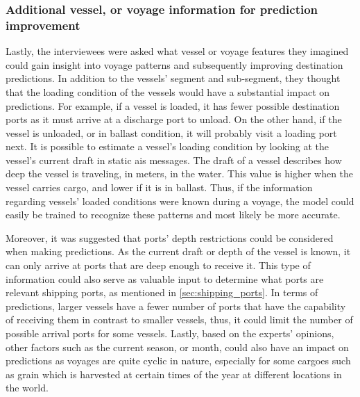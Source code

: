 \subsubsection{Additional vessel, or voyage information for prediction improvement}

Lastly, the interviewees were asked what vessel or voyage features they imagined could gain insight into voyage patterns and subsequently improving destination predictions. In addition to the vessels' segment and sub-segment, they thought that the loading condition of the vessels would have a substantial impact on predictions. For example, if a vessel is loaded, it has fewer possible destination ports as it must arrive at a discharge port to unload. On the other hand, if the vessel is unloaded, or in ballast condition, it will probably visit a loading port next. It is possible to estimate a vessel's loading condition by looking at the vessel's current draft in static \acrshort{ais} messages. The draft of a vessel describes how deep the vessel is traveling, in meters, in the water. This value is higher when the vessel carries cargo, and lower if it is in ballast. Thus, if the information regarding vessels' loaded conditions were known during a voyage, the model could easily be trained to recognize these patterns and most likely be more accurate.

Moreover, it was suggested that ports' depth restrictions could be considered when making predictions. As the current draft or depth of the vessel is known, it can only arrive at ports that are deep enough to receive it. This type of information could also serve as valuable input to determine what ports are relevant shipping ports, as mentioned in \cref{sec:shipping_ports}. In terms of predictions, larger vessels have a fewer number of ports that have the capability of receiving them in contrast to smaller vessels, thus, it could limit the number of possible arrival ports for some vessels. Lastly, based on the experts' opinions, other factors such as the current season, or month, could also have an impact on predictions as voyages are quite cyclic in nature, especially for some cargoes such as grain which is harvested at certain times of the year at different locations in the world.
